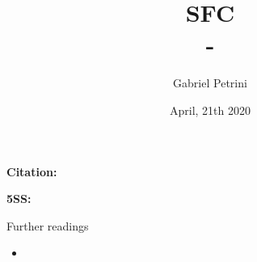 \documentclass[10pt,lineno]{../_configs}
\title{
\large{SFC}\vspace{2pt}\\
\Huge{\autor - \citetitle*{botta_when_2019}}
}
\date{April, 21th 2020}
\author[$\ast$]{Gabriel Petrini}
\affil[$\ast$]{PhD Student at Unicamp.}
\newcommand{\autor}{\textcite{botta_when_2019} }
\begin{document}
\maketitle
\articletypemark
\marginmark
\thispagestyle{firststyle}

\noindent \textbf{Citation:} 	

\begin{infobox}
	\textbf{5SS:} \autor 
\end{infobox}

\begin{redbox}{Further readings}
	\begin{itemize}
		\item 
	\end{itemize}
\end{redbox}

\printbibliography
	
\end{document}
